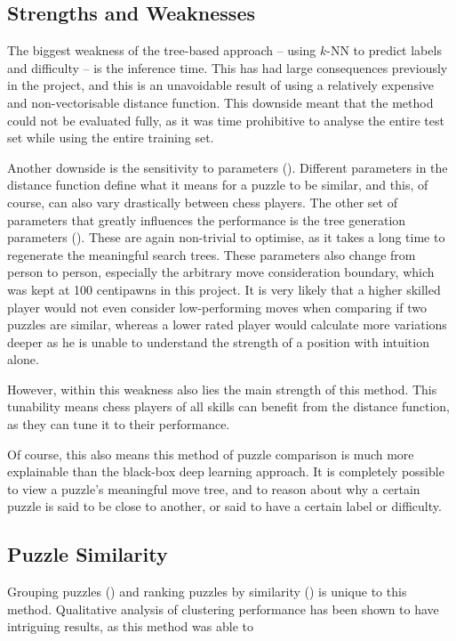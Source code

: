 \subsection{Strengths and Weaknesses}\label{evalS41}

The biggest weakness of the tree-based approach -- using $k$-NN to predict
labels and difficulty -- is the inference time. This has had large consequences
previously in the project, and this is an unavoidable result of using a
relatively expensive and non-vectorisable distance function. This downside
meant that the method could not be evaluated fully, as it was time prohibitive
to analyse the entire test set while using the entire training set.

Another downside is the sensitivity to parameters (). Different
parameters in the distance function define what it means for a puzzle to be
similar, and this, of course, can also vary drastically between chess players.
The other set of parameters that greatly influences the performance is the tree
generation parameters (). These are again non-trivial to
optimise, as it takes a long time to regenerate the meaningful search trees.
These parameters also change from person to person, especially the arbitrary
move consideration boundary, which was kept at 100 centipawns in this project.
It is very likely that a higher skilled player would not even consider
low-performing moves when comparing if two puzzles are similar, whereas a lower
rated player would calculate more variations deeper as he is unable to
understand the strength of a position with intuition alone.

However, within this weakness also lies the main strength of this method. This
tunability means chess players of all skills can benefit from the distance
function, as they can tune it to their performance.

Of course, this also means this method of puzzle comparison is much more
explainable than the black-box deep learning approach. It is completely
possible to view a puzzle's meaningful move tree, and to reason about why a
certain puzzle is said to be close to another, or said to have a certain label
or difficulty.

\subsection{Puzzle Similarity}\label{evalS42}

Grouping puzzles () and ranking puzzles by similarity
() is unique to this method. Qualitative analysis of clustering performance has been shown to have intriguing results, as this method was able to  

